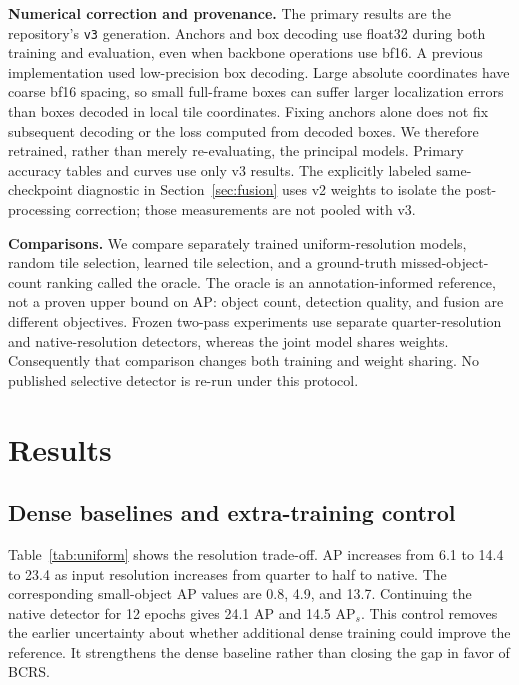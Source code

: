 \documentclass[conference]{IEEEtran}
\begin{document}
\textbf{Numerical correction and provenance.} The primary results are the repository's \texttt{v3} generation. Anchors and box decoding use float32 during both training and evaluation, even when backbone operations use bf16. A previous implementation used low-precision box decoding. Large absolute coordinates have coarse bf16 spacing, so small full-frame boxes can suffer larger localization errors than boxes decoded in local tile coordinates. Fixing anchors alone does not fix subsequent decoding or the loss computed from decoded boxes. We therefore retrained, rather than merely re-evaluating, the principal models. Primary accuracy tables and curves use only v3 results. The explicitly labeled same-checkpoint diagnostic in Section~\ref{sec:fusion} uses v2 weights to isolate the post-processing correction; those measurements are not pooled with v3.

\textbf{Comparisons.} We compare separately trained uniform-resolution models, random tile selection, learned tile selection, and a ground-truth missed-object-count ranking called the oracle. The oracle is an annotation-informed reference, not a proven upper bound on AP: object count, detection quality, and fusion are different objectives. Frozen two-pass experiments use separate quarter-resolution and native-resolution detectors, whereas the joint model shares weights. Consequently that comparison changes both training and weight sharing. No published selective detector is re-run under this protocol.

\section{Results}
\subsection{Dense baselines and extra-training control}
\label{sec:uniform}
\begingroup
\setlength{\tabcolsep}{4pt}

\endgroup
Table~\ref{tab:uniform} shows the resolution trade-off. AP increases from 6.1 to 14.4 to 23.4 as input resolution increases from quarter to half to native. The corresponding small-object AP values are 0.8, 4.9, and 13.7. Continuing the native detector for 12 epochs gives 24.1 AP and 14.5 AP$_s$. This control removes the earlier uncertainty about whether additional dense training could improve the reference. It strengthens the dense baseline rather than closing the gap in favor of BCRS.
\end{document}
